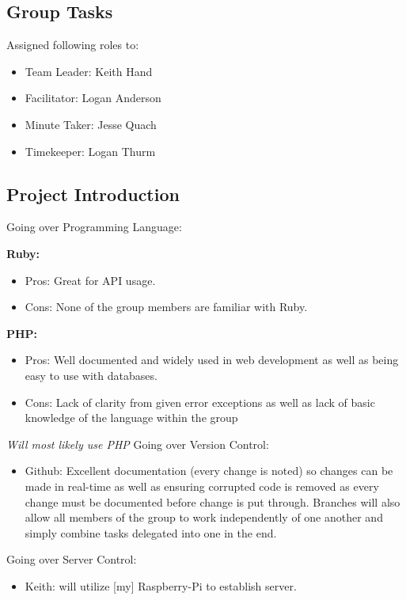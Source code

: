 \subsection{Group Tasks}
    Assigned following roles to:
	\begin{itemize}
		\item Team Leader: Keith Hand
		\item Facilitator: Logan Anderson
		\item Minute Taker: Jesse Quach
		\item Timekeeper: Logan Thurm
    \end{itemize}

\subsection{Project Introduction}
    Going over Programming Language: \newline
	
		\textbf{Ruby:}	
		\begin{itemize}
			\item Pros: Great for API usage.
			\item Cons: None of the group members are familiar with Ruby.
		\end{itemize}
		\newpage
		\textbf{PHP:}	
		\begin{itemize}
			\item Pros: Well documented and widely used in web development as well as being easy to use with databases.
			\item Cons: Lack of clarity from given error exceptions as well as lack of basic knowledge of the language within the group
		\end{itemize}
		
	\emph{\small{Will most likely use PHP}} \newline\newline
	Going over Version Control:
	\begin{itemize}
		\item Github: Excellent documentation (every change is noted) so changes can be made in real-time
		as well as ensuring corrupted code is removed as every change must be documented before 
		change is put through. Branches will also allow all members of the group to work 
		independently of one another and simply combine tasks delegated into one in the end.
	\end{itemize}
	Going over Server Control:
	\begin{itemize}
		\item Keith: will utilize [my] Raspberry-Pi to establish server.
	\end{itemize}

